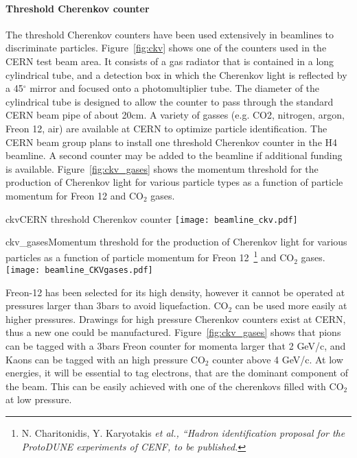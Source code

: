 \paragraph{Threshold Cherenkov counter}
The threshold Cherenkov counters have been used extensively in beamlines to discriminate particles. Figure~\ref{fig:ckv} shows one of the counters used in the CERN test beam area. It consists of a gas radiator that is contained in a long cylindrical tube, and a detection box in which the Cherenkov light is reflected by a 45$^\circ$ mirror and focused onto a photomultiplier tube. The diameter of the cylindrical tube is designed to allow the counter to pass through the standard CERN beam pipe of about 20cm. A variety of gasses (e.g. CO2, nitrogen, argon, Freon 12, air) are available at CERN to optimize particle identification. The CERN beam group plans to install one threshold Cherenkov counter in the H4 beamline. A second counter may be added to the beamline if additional funding is available. 
Figure~\ref{fig:ckv_gases} shows the momentum threshold 
for the production of Cherenkov light for various particle types as a function of particle momentum for Freon 12 and CO$_2$ gases.
\begin{cdrfigure}{ckv}{CERN threshold Cherenkov counter}
  \texttt{[image: beamline\_ckv.pdf]}
\end{cdrfigure}
\begin{cdrfigure}{ckv_gases}{Momentum threshold  for the production of Cherenkov light for various particles as a function of particle momentum for Freon 12~\footnote{N. Charitonidis, Y. Karyotakis \it{et al.}, ``Hadron identification proposal for the ProtoDUNE experiments of CENF, to be published.} and CO$_2$ gases.}
  \texttt{[image: beamline\_CKVgases.pdf]}
\end{cdrfigure}
Freon-12 has been selected for its high density, however it cannot be operated at pressures larger than 3bars to avoid liquefaction.  CO$_2$ can be used more easily at higher pressures.  Drawings for high pressure Cherenkov counters exist at CERN, thus a new one could be manufactured. 
 Figure~\ref{fig:ckv_gases} shows that pions can be tagged with a 3bars Freon counter for momenta larger that 2 GeV/c, and Kaons can be tagged with an high pressure  CO$_2$  counter above 4 GeV/c. 
At low energies, it will be essential  to tag electrons, that are the dominant component of the beam. This can be easily achieved with one   of the cherenkovs filled with CO$_2$ at low pressure.

